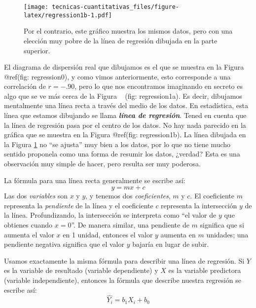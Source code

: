 \documentclass[
]{book}
\begin{document}
\begin{figure}
\centering
\texttt{[image: tecnicas-cuantitativas\_files/figure-latex/regression1b-1.pdf]}
\caption{\label{fig:regression1b}Por el contrario, este gráfico muestra los mismos datos, pero con una elección muy pobre de la línea de regresión dibujada en la parte superior.}
\end{figure}

El diagrama de dispersión real que dibujamos es el que se muestra en la Figura @ref(fig: regression0), y como vimos anteriormente, esto corresponde a una correlación de \(r=-.90\), pero lo que nos encontramos imaginando en secreto es algo que se ve más cerca de la Figura ~\citet{ref} (fig: regression1a). Es decir, dibujamos mentalmente una línea recta a través del medio de los datos. En estadística, esta línea que estamos dibujando se llama \textbf{\emph{línea de regresión}}. Tened en cuenta que la línea de regresión pasa por el centro de los datos. No hay nada parecido en la gráfica que se muestra en la Figura @ref(fig: regression1b). La línea dibujada en la Figura \ref{fig:regression1b} no ``se ajusta'' muy bien a los datos, por lo que no tiene mucho sentido proponela como una forma de resumir los datos, ¿verdad? Esta es una observación muy simple de hacer, pero resulta ser muy poderosa.

La fórmula para una línea recta generalmente se escribe así:
\[
y = mx + c
\]
Las dos \emph{variables} son \(x\) y \(y\), y tenemos dos \emph{coeficientes}, \(m\) y \(c\). El coeficiente \(m\) representa la \emph{pendiente} de la línea y el coeficiente \(c\) representa la intersección \(y\) de la línea. Profundizando, la intersección se interpreta como ``el valor de \(y\) que obtienes cuando \(x=0\)''. De manera similar, una pendiente de \(m\) significa que si aumenta el valor \(x\) en 1 unidad, entonces el valor \(y\) aumenta en \(m\) unidades; una pendiente negativa significa que el valor \(y\) bajaría en lugar de subir.

Usamos exactamente la misma fórmula para describir una línea de regresión. Si \(Y\) es la variable de resultado (variable dependiente) y \(X\) es la variable predictora (variable independiente), entonces la fórmula que describe nuestra regresión se escribe así:
\[
\hat{Y_i} = b_1 X_i + b_0
\]
\end{document}
